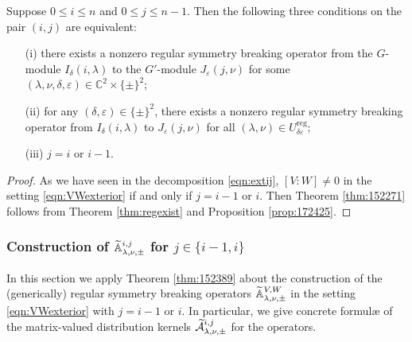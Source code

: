 \begin{theorem}
\label{thm:152271}
Suppose $0 \le i \le n$
 and $0 \le j \le n-1$.  
Then the following three conditions on the pair $(i,j)$ are equivalent:
\begin{enumerate}
\item[{\rm{(i)}}]
 there exists a nonzero regular symmetry breaking operator from the $G$-module
 $I_{\delta}(i,\lambda)$ to the $G'$-module $J_{\varepsilon}(j,\nu)$
 for some $(\lambda,\nu,\delta,\varepsilon) \in {\mathbb{C}}^2 \times \{ \pm \}^2$;
\item[{\rm{(ii)}}]
 for any $(\delta,\varepsilon) \in \{ \pm \}^2$, 
 there exists a nonzero regular symmetry breaking operator from 
 $I_{\delta}(i,\lambda)$ to $J_{\varepsilon}(j,\nu)$
 for all $(\lambda,\nu) \in U_{\delta \varepsilon}^{{\operatorname{reg}}}$;
\item[{\rm{(iii)}}]
 $j=i$ or $i-1$.  
\end{enumerate}
\end{theorem}

\begin{proof}
As we have seen in the decomposition \eqref{eqn:extij},  
 $[V:W] \ne 0$ in the setting \eqref{eqn:VWexterior}
 if and only if $j=i-1$ or $i$.  
Then Theorem \ref{thm:152271} follows from Theorem \ref{thm:regexist}
 and Proposition \ref{prop:172425}.  
\end{proof}

\subsubsection{Construction of ${\widetilde{\mathbb{A}}}_{{\lambda},{\nu},{\pm}}^{{i,j}}$
 for $j \in \{i-1,i\}$}

In this section 
 we apply Theorem \ref{thm:152389}
 about the construction
 of the (generically) regular symmetry breaking operators
 ${\widetilde{\mathbb{A}}}_{{\lambda},{\nu},{\pm}}^{{V,W}}$
 in the setting \eqref{eqn:VWexterior}
 with $j=i-1$ or $i$.  
In particular,
 we give concrete formul{\ae}
 of the matrix-valued distribution kernels
 $\widetilde{{\mathcal{A}}}_{{\lambda},{\nu},{\pm}}^{{i,j}}$
 for the operators.  



